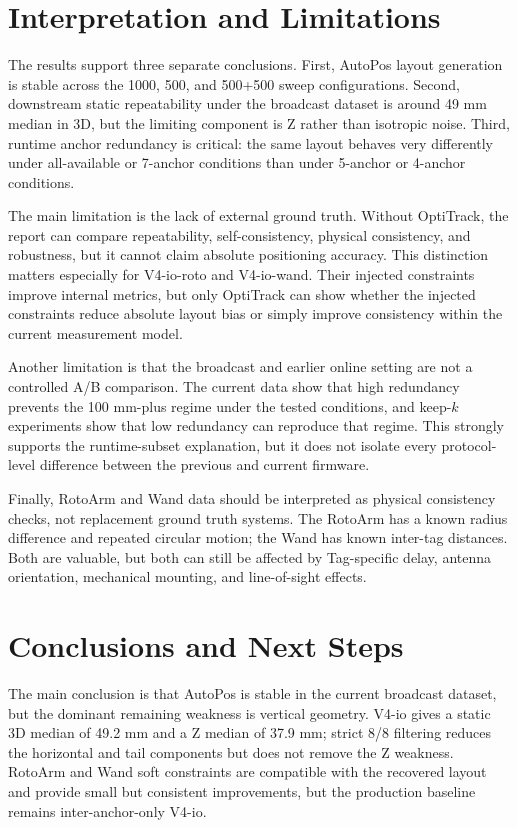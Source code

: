 \documentclass[11pt]{article}
\begin{document}
\section{Interpretation and Limitations}

The results support three separate conclusions. First, AutoPos layout generation is stable across the 1000, 500, and 500+500 sweep configurations. Second, downstream static repeatability under the broadcast dataset is around 49 mm median in 3D, but the limiting component is Z rather than isotropic noise. Third, runtime anchor redundancy is critical: the same layout behaves very differently under all-available or 7-anchor conditions than under 5-anchor or 4-anchor conditions.

The main limitation is the lack of external ground truth. Without OptiTrack, the report can compare repeatability, self-consistency, physical consistency, and robustness, but it cannot claim absolute positioning accuracy. This distinction matters especially for V4-io-roto and V4-io-wand. Their injected constraints improve internal metrics, but only OptiTrack can show whether the injected constraints reduce absolute layout bias or simply improve consistency within the current measurement model.

Another limitation is that the broadcast and earlier online setting are not a controlled A/B comparison. The current data show that high redundancy prevents the 100 mm-plus regime under the tested conditions, and keep-$k$ experiments show that low redundancy can reproduce that regime. This strongly supports the runtime-subset explanation, but it does not isolate every protocol-level difference between the previous and current firmware.

Finally, RotoArm and Wand data should be interpreted as physical consistency checks, not replacement ground truth systems. The RotoArm has a known radius difference and repeated circular motion; the Wand has known inter-tag distances. Both are valuable, but both can still be affected by Tag-specific delay, antenna orientation, mechanical mounting, and line-of-sight effects.

\section{Conclusions and Next Steps}

The main conclusion is that AutoPos is stable in the current broadcast dataset, but the dominant remaining weakness is vertical geometry. V4-io gives a static 3D median of 49.2 mm and a Z median of 37.9 mm; strict 8/8 filtering reduces the horizontal and tail components but does not remove the Z weakness. RotoArm and Wand soft constraints are compatible with the recovered layout and provide small but consistent improvements, but the production baseline remains inter-anchor-only V4-io.
\end{document}
